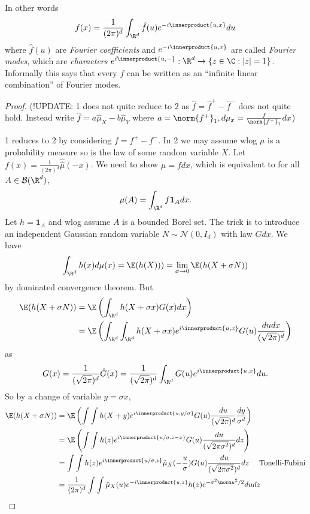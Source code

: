 \documentclass[a4paper]{article}
\newcommand*{\ip}{\innerproduct} %
\begin{document}
\begin{remark}
  In other words
  \[
    f(x) = \frac{1}{(2\pi)^d} \int_{\R^d} \hat f(u) e^{-i \ip{u, x}} du
  \]
  where \(\hat f(u)\) are \emph{Fourier coefficients} and \(e^{-i\ip{u, x}}\) are called \emph{Fourier modes}, which are \emph{characters} \(e^{i\ip{u, -}}: \R^d \to \{z \in \C: |z| = 1\}\). Informally this says that every \(f\) can be written as an ``infinite linear combination'' of Fourier modes.
\end{remark}

\begin{proof}
  (!UPDATE: 1 does not quite reduce to 2 as \(\hat f = \hat f^+ - \hat f^-\) does not quite hold. Instead write \(\hat f = a \hat \mu_X - b \hat \mu_Y\) where \(a = \norm{f^+}_1, d\mu_x = \frac{f}{\norm{f^+}_1}dx\))
  
  1 reduces to 2 by considering \(f = f^+ - f^-\). In 2 we may assume wlog \(\mu\) is a probability measure so is the law of some random variable \(X\). Let \(f(x) = \frac{1}{(2\pi)^d} \hat{\hat \mu}(-x)\). We need to show \(\mu = fdx\), which is equivalent to for all \(A \in \mathcal B(\R^d)\),
  \[
    \mu(A) = \int_{\R^d} f \mathbf 1_A dx.
  \]
  Let \(h = \mathbf 1_A\) and wlog assume \(A\) is a bounded Borel set. The trick is to introduce an independent Gaussian random variable \(N \sim \mathcal N(0, I_d)\) with law \(G dx\). We have
  \[
    \int_{\R^d} h(x) d\mu(x) = \E(h(X))) = \lim_{\sigma \to 0} \E(h(X + \sigma N))
  \]
  by dominated convergence theorem. But
  \begin{align*}
    \E(h(X + \sigma N))
    &= \E \left(\int_{\R^d} h(X + \sigma x) G(x) dx \right) \\
    &= \E \left(\int_{\R^d} \int_{\R^d} h(X + \sigma x) e^{i \ip{u, x}} G(u) \frac{du dx}{(\sqrt{2\pi})^d} \right) \\
  \end{align*}
  as
  \[
    G(x) = \frac{1}{(\sqrt{2\pi})^d} \hat G(x) = \frac{1}{(\sqrt{2\pi})^d} \int_{\R^d} G(u) e^{i \ip{u, x}} du.
  \]
  So by a change of variable \(y = \sigma x\),
  \begin{align*}
    \E(h(X + \sigma N))
    &= \E \left(\int \int h(X + y) e^{i \ip{u, y/\sigma}} G(u) \frac{du}{(\sqrt{2\pi})^d} \frac{dy}{\sigma^d} \right) \\
    &= \E \left(\int \int h(z) e^{i \ip{u/\sigma, z - x}} G(u) \frac{du}{(\sqrt{2\pi \sigma^2})^d} dz \right) \\
    &= \int \int h(z) e^{i \ip{u/\sigma, z}} \hat \mu_X(- \frac{u}{\sigma}) G(u) \frac{du}{(\sqrt{2\pi \sigma^2})^d} dz \quad \text{ Tonelli-Fubini} \\
    &= \frac{1}{(2\pi)^d} \int \int \hat \mu_X(u) e^{-i \ip{u, z}} h(z) e^{-\sigma^2 \norm u^2/2} dudz
  \end{align*}
\end{proof}
\end{document}
